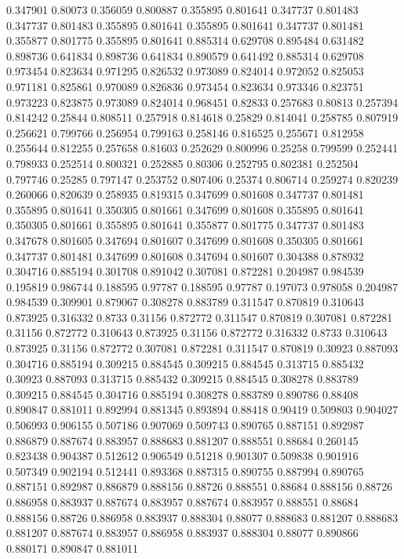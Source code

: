 0.347901 0.80073
0.356059 0.800887
0.355895 0.801641
0.347737 0.801483
0.347737 0.801483
0.355895 0.801641
0.355895 0.801641
0.347737 0.801481
0.355877 0.801775
0.355895 0.801641
0.885314 0.629708
0.895484 0.631482
0.898736 0.641834
0.898736 0.641834
0.890579 0.641492
0.885314 0.629708
0.973454 0.823634
0.971295 0.826532
0.973089 0.824014
0.972052 0.825053
0.971181 0.825861
0.970089 0.826836
0.973454 0.823634
0.973346 0.823751
0.973223 0.823875
0.973089 0.824014
0.968451 0.82833
0.257683 0.80813
0.257394 0.814242
0.25844 0.808511
0.257918 0.814618
0.25829 0.814041
0.258785 0.807919
0.256621 0.799766
0.256954 0.799163
0.258146 0.816525
0.255671 0.812958
0.255644 0.812255
0.257658 0.81603
0.252629 0.800996
0.25258 0.799599
0.252441 0.798933
0.252514 0.800321
0.252885 0.80306
0.252795 0.802381
0.252504 0.797746
0.25285 0.797147
0.253752 0.807406
0.25374 0.806714
0.259274 0.820239
0.260066 0.820639
0.258935 0.819315
0.347699 0.801608
0.347737 0.801481
0.355895 0.801641
0.350305 0.801661
0.347699 0.801608
0.355895 0.801641
0.350305 0.801661
0.355895 0.801641
0.355877 0.801775
0.347737 0.801483
0.347678 0.801605
0.347694 0.801607
0.347699 0.801608
0.350305 0.801661
0.347737 0.801481
0.347699 0.801608
0.347694 0.801607
0.304388 0.878932
0.304716 0.885194
0.301708 0.891042
0.307081 0.872281
0.204987 0.984539
0.195819 0.986744
0.188595 0.97787
0.188595 0.97787
0.197073 0.978058
0.204987 0.984539
0.309901 0.879067
0.308278 0.883789
0.311547 0.870819
0.310643 0.873925
0.316332 0.8733
0.31156 0.872772
0.311547 0.870819
0.307081 0.872281
0.31156 0.872772
0.310643 0.873925
0.31156 0.872772
0.316332 0.8733
0.310643 0.873925
0.31156 0.872772
0.307081 0.872281
0.311547 0.870819
0.30923 0.887093
0.304716 0.885194
0.309215 0.884545
0.309215 0.884545
0.313715 0.885432
0.30923 0.887093
0.313715 0.885432
0.309215 0.884545
0.308278 0.883789
0.309215 0.884545
0.304716 0.885194
0.308278 0.883789
0.890786 0.88408
0.890847 0.881011
0.892994 0.881345
0.893894 0.88418
0.90419 0.509803
0.904027 0.506993
0.906155 0.507186
0.907069 0.509743
0.890765 0.887151
0.892987 0.886879
0.887674 0.883957
0.888683 0.881207
0.888551 0.88684
0.260145 0.823438
0.904387 0.512612
0.906549 0.51218
0.901307 0.509838
0.901916 0.507349
0.902194 0.512441
0.893368 0.887315
0.890755 0.887994
0.890765 0.887151
0.892987 0.886879
0.888156 0.88726
0.888551 0.88684
0.888156 0.88726
0.886958 0.883937
0.887674 0.883957
0.887674 0.883957
0.888551 0.88684
0.888156 0.88726
0.886958 0.883937
0.888304 0.88077
0.888683 0.881207
0.888683 0.881207
0.887674 0.883957
0.886958 0.883937
0.888304 0.88077
0.890866 0.880171
0.890847 0.881011
